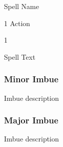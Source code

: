 \begin{monsterbox}{Spell Name}
	\hline
	\begin{monsteraction}[Action]
		1 Action
	\end{monsteraction}
	\hspace{1cm}
	\begin{monsteraction}[Power]
		1
	\end{monsteraction}
	
	
	Spell Text
	
	\subsubsection {Minor Imbue}
	
	Imbue description
	
	\subsubsection {Major Imbue}
	
	Imbue description
	
\end{monsterbox}